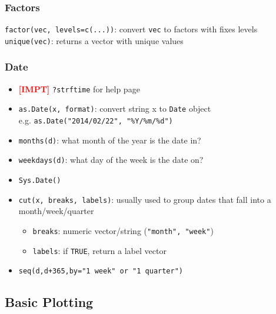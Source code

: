 \documentclass{article}
\newcommand{\impt}[0]{\textcolor{red}{\textbf{[IMPT] }}}
\begin{document}
\begin{multicols}{2}
\subsubsection*{Factors}
\texttt{factor(vec, levels=c(...))}: convert \texttt{vec} to factors with fixes levels\\
\texttt{unique(vec)}: returns a vector with unique values

\subsubsection*{Date}
\begin{itemize}
	\item \impt \texttt{?strftime} for help page
	\item \texttt{as.Date(x, format)}: convert string x to \texttt{Date} object \\ e.g. \texttt{as.Date("2014/02/22", "\%Y/\%m/\%d")}
	\item \texttt{months(d)}: what month of the year is the date in?
	\item \texttt{weekdays(d)}: what day of the week is the date on?
	\item \texttt{Sys.Date()}
	\item \texttt{cut(x, breaks, labels)}: usually used to group dates that fall into a month/week/quarter
	\begin{itemize}
		\item \texttt{breaks}: numeric vector/string (\texttt{"month", "week"})
		\item \texttt{labels}: if \texttt{TRUE}, return a label vector
	\end{itemize}
\item \texttt{seq(d,d+365,by="1 week" or "1 quarter")}

\end{itemize}

\subsection*{Basic Plotting}

\end{multicols}
\end{document}
